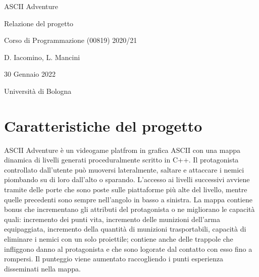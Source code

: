 \documentclass[12pt]{article}
\begin{document}
\begin{titlepage}
   \begin{center}
        \vspace*{5cm}

        \Huge{ASCII Adventure}

        \vspace{0.5cm}
        \LARGE{Relazione del progetto}
        
        \vspace{0.25cm}
        \large{Corso di Programmazione (00819) 2020/21}
       
        \vspace{0.25cm}
        \large{D. Iacomino, L. Mancini}
       
        \vspace{3 cm}
        \Large{30 Gennaio 2022}
        
        \vspace{0.25 cm}
        \Large{Università di Bologna}
       

       \vfill
    \end{center}
\end{titlepage}

\setcounter{page}{2}
\pagestyle{fancy}
\fancyhf{}
\rhead{\thepage}

\section*{Caratteristiche del progetto}

ASCII Adventure è un videogame platfrom in grafica ASCII con una mappa dinamica di livelli generati proceduralmente scritto in C++.
Il protagonista controllato dall'utente può muoversi lateralmente, saltare e attaccare i nemici piombando su di loro dall'alto o sparando.
L'accesso ai livelli successivi avviene tramite delle porte che sono poste sulle piattaforme più alte del livello, mentre quelle precedenti sono sempre nell'angolo in basso a sinistra.
La mappa contiene bonus che incrementano gli attributi del protagonista o ne migliorano le capacità quali: incremento dei punti vita, incremento delle munizioni dell'arma equipaggiata, incremento della quantità di munizioni trasportabili, capacità di eliminare i nemici con un solo proiettile; contiene anche delle trappole che infliggono danno al protagonista e che sono logorate dal contatto con esso fino a rompersi.
Il punteggio viene aumentato raccogliendo i punti esperienza disseminati nella mappa.
\end{document}
